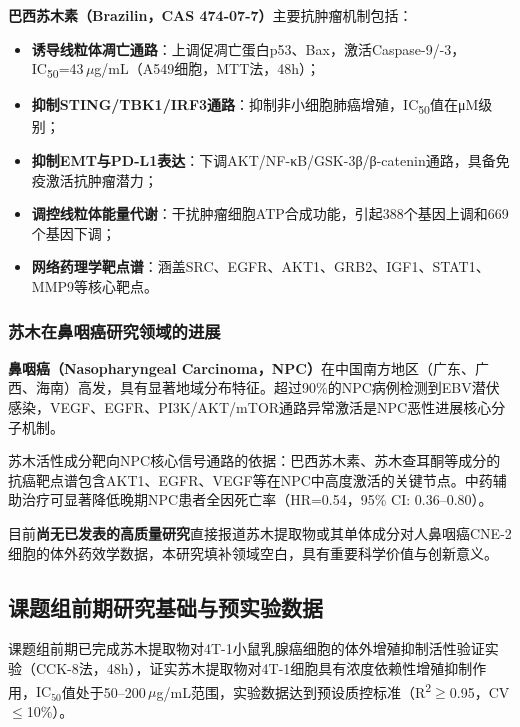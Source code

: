 \documentclass[12pt,a4paper]{article}
\newcommand{\ic}{\ensuremath{\text{IC}_{50}}}
\newcommand{\um}{\,$\mu$g/mL}
\begin{document}
\textbf{巴西苏木素（Brazilin，CAS 474-07-7）}主要抗肿瘤机制包括：

\begin{itemize}
\item \textbf{诱导线粒体凋亡通路}：上调促凋亡蛋白p53、Bax，激活Caspase-9/-3，IC\textsubscript{50}=43\um{}（A549细胞，MTT法，48h）\cite{ref2}；
\item \textbf{抑制STING/TBK1/IRF3通路}：抑制非小细胞肺癌增殖，IC\textsubscript{50}值在μM级别\cite{ref5}；
\item \textbf{抑制EMT与PD-L1表达}：下调AKT/NF-κB/GSK-3β/β-catenin通路，具备免疫激活抗肿瘤潜力\cite{ref6}；
\item \textbf{调控线粒体能量代谢}：干扰肿瘤细胞ATP合成功能，引起388个基因上调和669个基因下调\cite{ref3}；
\item \textbf{网络药理学靶点谱}：涵盖SRC、EGFR、AKT1、GRB2、IGF1、STAT1、MMP9等核心靶点\cite{ref4}。
\end{itemize}

\subsubsection{苏木在鼻咽癌研究领域的进展}

\textbf{鼻咽癌（Nasopharyngeal Carcinoma，NPC）}在中国南方地区（广东、广西、海南）高发，具有显著地域分布特征。超过90\%的NPC病例检测到EBV潜伏感染，VEGF、EGFR、PI3K/AKT/mTOR通路异常激活是NPC恶性进展核心分子机制\cite{ref9,ref11}。

苏木活性成分靶向NPC核心信号通路的依据：巴西苏木素、苏木查耳酮等成分的抗癌靶点谱包含AKT1、EGFR、VEGF等在NPC中高度激活的关键节点\cite{ref17}。中药辅助治疗可显著降低晚期NPC患者全因死亡率（HR=0.54，95\% CI: 0.36--0.80）\cite{ref16}。

\begin{notebox}
目前\textbf{尚无已发表的高质量研究}直接报道苏木提取物或其单体成分对人鼻咽癌CNE-2细胞的体外药效学数据，本研究填补领域空白，具有重要科学价值与创新意义。
\end{notebox}

\subsection{课题组前期研究基础与预实验数据}

课题组前期已完成苏木提取物对4T-1小鼠乳腺癌细胞的体外增殖抑制活性验证实验（CCK-8法，48h），证实苏木提取物对4T-1细胞具有浓度依赖性增殖抑制作用，\ic{}值处于50--200\um{}范围，实验数据达到预设质控标准（R\textsuperscript{2}$\geq$0.95，CV$\leq$10\%）。
\end{document}
